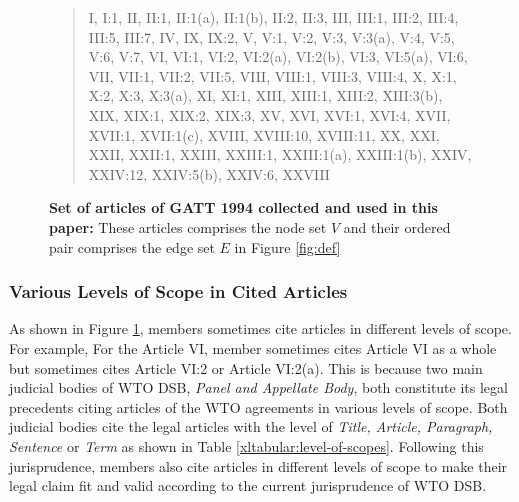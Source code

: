 \begin{figure}[h]
    \begin{quote}
    I, 
    I:1, 
    II, 
    II:1, 
    II:1(a), 
    II:1(b), 
    II:2, 
    II:3, 
    III, 
    III:1, 
    III:2, 
    III:4, 
    III:5, 
    III:7, 
    IV, 
    IX, 
    IX:2, 
    V, 
    V:1, 
    V:2, 
    V:3, 
    V:3(a), 
    V:4, 
    V:5, 
    V:6, 
    V:7, 
    VI, 
    VI:1, 
    VI:2, 
    VI:2(a), 
    VI:2(b), 
    VI:3, 
    VI:5(a), 
    VI:6, 
    VII, 
    VII:1, 
    VII:2, 
    VII:5, 
    VIII, 
    VIII:1, 
    VIII:3, 
    VIII:4, 
    X, 
    X:1, 
    X:2, 
    X:3, 
    X:3(a), 
    XI, 
    XI:1, 
    XIII, 
    XIII:1, 
    XIII:2, 
    XIII:3(b), 
    XIX, 
    XIX:1, 
    XIX:2, 
    XIX:3, 
    XV, 
    XVI, 
    XVI:1, 
    XVI:4, 
    XVII, 
    XVII:1, 
    XVII:1(c), 
    XVIII, 
    XVIII:10, 
    XVIII:11, 
    XX, 
    XXI, 
    XXII, 
    XXII:1, 
    XXIII, 
    XXIII:1, 
    XXIII:1(a), 
    XXIII:1(b), 
    XXIV, 
    XXIV:12, 
    XXIV:5(b), 
    XXIV:6, 
    XXVIII
    \end{quote}
    \caption{
        \textbf{
            Set of articles of GATT 1994 collected and used in this paper: 
            }These articles comprises the node set $V$ and their ordered pair comprises the edge set $E$ in Figure \ref{fig:def}
        }
    \label{fig:set-of-articles-used}
\end{figure}

\subsubsection{Various Levels of Scope in Cited Articles}
As shown in Figure \ref{fig:set-of-articles-used}, 
members sometimes
cite articles in different levels of scope. For example, 
For the Article VI, member sometimes cites
Article VI as a whole but sometimes cites
Article VI:2 or Article VI:2(a).
This is because two main judicial bodies of WTO DSB, \textit{Panel and Appellate Body}, 
both constitute its legal precedents citing articles of the WTO agreements in
various levels of scope.
Both judicial bodies cite the legal articles with the level of \textit{Title, Article, Paragraph, Sentence} or \textit{Term} as shown in Table {\ref{xltabular:level-of-scopes}}. 
Following this jurisprudence, members also cite articles in different levels of scope to 
make their legal claim fit and valid according to the current jurisprudence of WTO DSB.\\ %

